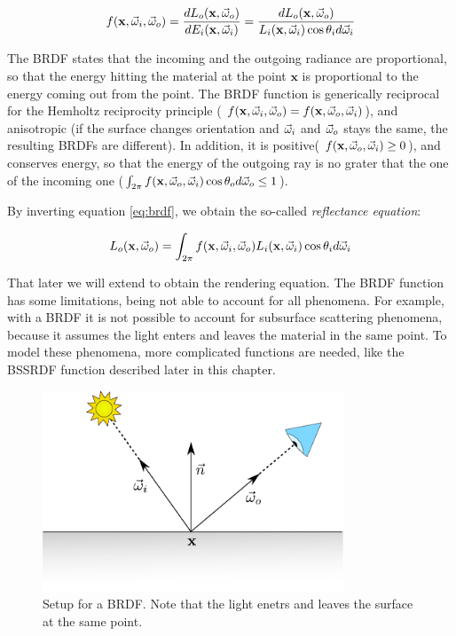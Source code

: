 \begin{equation}
f(\mathbf{x}, \vec{\omega}_i, \vec{\omega}_o) = \frac{d L_o(\mathbf{x}, \vec{\omega}_o)}{d E_i(\mathbf{x}, \vec{\omega}_i)} = \frac{d L_o(\mathbf{x}, \vec{\omega}_o)}{L_i(\mathbf{x}, \vec{\omega}_i) \cos\theta_i d \vec{\omega}_i}
\label{eq:brdf}
\end{equation}

The BRDF states that the incoming and the outgoing radiance are proportional, so that the energy hitting the material at the point $\mathbf{x}$ is proportional to the energy coming out from the point. The BRDF function is generically reciprocal for the Hemholtz reciprocity principle ( $f(\mathbf{x}, \vec{\omega}_i, \vec{\omega}_o) = f(\mathbf{x}, \vec{\omega}_o, \vec{\omega}_i)$), and anisotropic (if the surface changes orientation and $\vec{\omega}_i$ and $\vec{\omega}_o$ stays the same, the resulting BRDFs are different). In addition, it is positive( $f(\mathbf{x}, \vec{\omega}_o, \vec{\omega}_i) \ge 0$), and conserves energy, so that the energy of the outgoing ray is no grater that the one of the incoming one ($\int_{2\pi}  f(\mathbf{x}, \vec{\omega}_o, \vec{\omega}_i) \cos\theta_o d\vec{\omega}_o \le 1$).

By inverting equation \ref{eq:brdf}, we obtain the so-called \emph{reflectance equation}:

$$
L_o(\mathbf{x}, \vec{\omega}_o) = \int_{2\pi} f(\mathbf{x}, \vec{\omega}_i, \vec{\omega}_o) L_i(\mathbf{x}, \vec{\omega}_i) \cos\theta_i d\vec{\omega}_i
$$

That later we will extend to obtain the rendering equation. The BRDF function has some limitations, being not able to account for all phenomena. For example, with a BRDF it is not possible to account for subsurface scattering phenomena, because it assumes the light enters and leaves the material in the same point. To model these phenomena, more complicated functions are needed, like the BSSRDF function described later in this chapter. 

\begin{figure}[!ht]
\centering
\includegraphics[width=0.8\textwidth]{images/brdf.pdf}
\caption{Setup for a BRDF. Note that the light enetrs and leaves the surface at the same point.}
\label{fig:brdf}
\end{figure}
 

